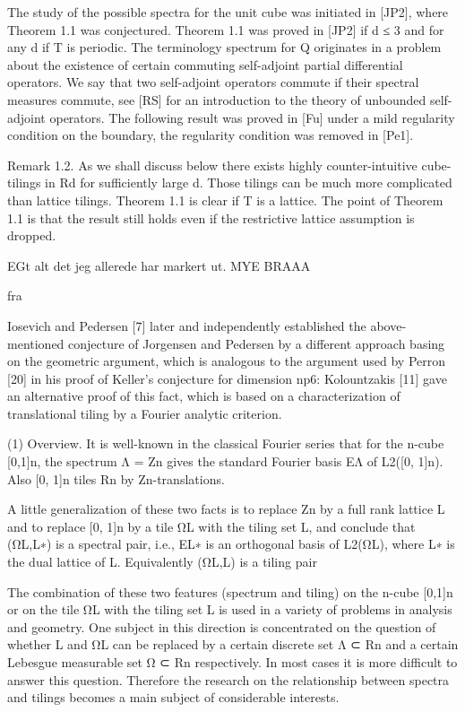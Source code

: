 \documentclass[../thesis.tex]{subfiles}
\begin{document}
The study of the possible spectra for the unit cube was initiated in [JP2], where Theorem 1.1 was conjectured. Theorem 1.1 was proved in [JP2] if d ≤ 3 and for any d if T is periodic. The terminology spectrum for Q originates in a problem about the existence of certain commuting self-adjoint partial differential operators. We say that two self-adjoint operators commute if their spectral measures commute, see [RS] for an introduction to the theory of unbounded self-adjoint operators. The following result was proved in [Fu] under a mild
regularity condition on the boundary, the regularity condition was removed in [Pe1].

Remark 1.2. As we shall discuss below there exists highly counter-intuitive cube-tilings in Rd for sufficiently large d. Those tilings can be much more complicated than lattice tilings. 
Theorem 1.1 is clear if T is a lattice. The point of Theorem 1.1 is that the result still holds even if the restrictive lattice assumption is dropped.

EGt alt det jeg allerede har markert ut. MYE BRAAA

fra 



Iosevich and Pedersen [7] later and independently established the above-mentioned conjecture of Jorgensen and Pedersen by a different approach basing on the geometric argument, which is analogous to the argument used by Perron [20] in his proof of Keller’s conjecture for dimension np6: Kolountzakis [11] gave an alternative proof of this fact, which is based on a characterization of translational tiling by a Fourier analytic criterion. 


(1) Overview. It is well-known in the classical Fourier series that for the n-cube [0,1]n, the spectrum Λ = Zn gives the standard Fourier basis EΛ of L2([0, 1]n). Also [0, 1]n tiles Rn by Zn-translations.

A little generalization of these two facts is to replace Zn by a full rank lattice L and to replace [0, 1]n by a tile ΩL with the tiling set L, and conclude that (ΩL,L∗) is a spectral pair, i.e., EL∗ is an orthogonal basis of L2(ΩL), where L∗ is the dual lattice of L. Equivalently (ΩL,L) is a tiling pair 

The combination of these two features (spectrum and tiling) on the n-cube [0,1]n or on the tile ΩL with the tiling set L is used in a variety of problems in analysis and geometry. One subject in this direction is concentrated on the question of whether L and ΩL can be replaced by a certain discrete set Λ ⊂ Rn and a certain Lebesgue measurable set Ω ⊂ Rn respectively. In most cases it is more difficult to answer this question. Therefore the research on the relationship between spectra and tilings becomes a main subject of considerable interests.
\end{document}

